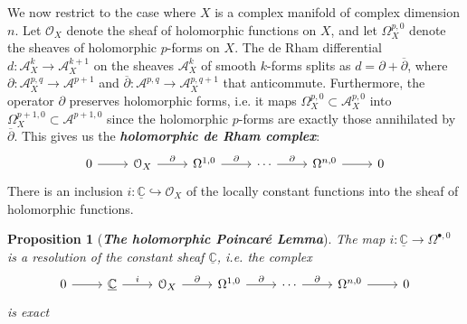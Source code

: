 \documentclass[psamsfonts, 12pt]{amsart}
\newtheorem{prop}[thm]{Proposition}
\theoremstyle{definition}
\theoremstyle{remark}
\renewcommand{\O}{\mathcal{O}}
\newcommand{\ib}[1]{\textbf{\textit{#1}}}
\newcommand{\C}{\mathbb{C}}
\newcommand{\dbar}{\overline{\partial}}
\begin{document}
We now restrict to the case where $X$ is a complex manifold of complex dimension $n$.
Let $\O_X$ denote the sheaf of holomorphic functions on $X$, and let $\Omega^{p,0}_X$
denote the sheaves of holomorphic $p$-forms on $X$. The de Rham differential
$d : \mathcal{A}^k_X \to \mathcal{A}^{k+1}_X$ on the sheaves $\mathcal{A}^k_X$
of smooth $k$-forms splits as $d = \partial + \dbar$, where
$\partial : \mathcal{A}^{p,q}_X \to \mathcal{A}^{p+1}$ and
$\dbar : \mathcal{A}^{p,q} \to \mathcal{A}^{p,q+1}_X$ that anticommute. Furthermore,
the operator $\partial$ preserves holomorphic forms, i.e. it maps
$\Omega^{p,0}_X \subset \mathcal{A}^{p,0}_X$ into
$\Omega^{p+1,0}_X \subset \mathcal{A}^{p+1,0}$ since the holomorphic $p$-forms
are exactly those annihilated by $\dbar$. This gives us the
\ib{holomorphic de Rham complex}:
\[\begin{tikzcd}
0 \ar[r]  & \O_X \ar[r, "\partial"] & \Omega^{1,0} \ar[r, "\partial"] &
\cdots \ar[r, "\partial"] & \Omega^{n,0} \ar[r] & 0
\end{tikzcd}\]
There is an inclusion $i : \underline{\C} \hookrightarrow \O_X$ of the locally
constant functions into the sheaf of holomorphic functions.
%
\begin{prop}[\ib{The holomorphic Poincar\'e Lemma}]
The map $i : \underline{\C} \to \Omega^{\bullet,0}$ is a resolution of the constant
sheaf $\underline{\C}$, i.e. the complex
\[\begin{tikzcd}
0 \ar[r] & \underline{\C} \ar[r, "i"] & \O_X \ar[r, "\partial"] &
\Omega^{1,0} \ar[r, "\partial"] & \cdots \ar[r, "\partial"] & \Omega^{n,0} \ar[r] & 0
\end{tikzcd}\]
is exact
\end{prop}
%
\end{document}
